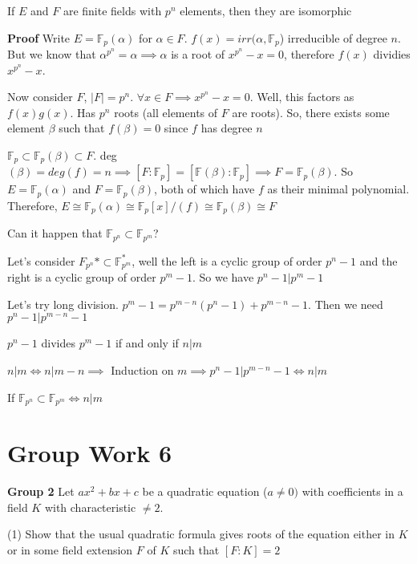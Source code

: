 \documentclass[10pt]{article}
\newcommand{\F}{\mathbb{F}}
\begin{document}
\begin{thm}
    If $E$ and $F$ are finite fields with $p^n$ elements, then they are isomorphic
\end{thm}
\textbf{Proof} Write $E = \F_p(\alpha)$ for $\alpha \in F$. $f(x) = irr(\alpha, \F_p$) irreducible of degree $n$. But we know that $\alpha^{p^n} = \alpha \implies \alpha$ is a root of $x^{p^n} - x =  0$, therefore $f(x)$ dividies $x^{p^n} - x$. 

Now consider $F$, $|F| = p^n$. $\forall x \in F \implies x^{p^n} - x = 0$. Well, this factors as $f(x)g(x)$. Has $p^n$ roots (all elements of $F$ are roots). So, there exists some element $\beta$ such that $f(\beta) = 0$ since $f$ has degree $n$

$\F_p \subset \F_p(\beta) \subset F$. deg$(\beta) = deg(f) = n \implies [F: \F_p] = [\F(\beta) : \F_p] \implies F = \F_p(\beta)$. So $E = \F_p(\alpha)$ and $F = \F_p(\beta)$, both of which have $f$ as their minimal polynomial. Therefore, $E \cong \F_p(\alpha) \cong \F_p[x]/(f) \cong \F_p(\beta) \cong F$

\begin{rmk}
    Can it happen that $\F_{p^n} \subset \F_{p^m}$?
\end{rmk}
Let's consider $F_{p^n}* \subset \F_{p^m}^*$, well the left is a cyclic group of order $p^n - 1$ and the right is a cyclic group of order $p^m - 1$. So we have $p^n - 1|p^m - 1$

Let's try long division. $p^m - 1 = p^{m-n}(p^n - 1) + p^{m-n} - 1$. Then we need $p^n - 1 | p^{m-n} - 1$

\begin{thm}
    $p^n - 1$ divides $p^m - 1$ if and only if $n | m$
\end{thm}
$n | m \iff n | m - n \implies$ Induction on $m \implies p^n - 1 | p^{m-n} - 1 \iff n | m$
\begin{cor}
    If $\F_{p^n} \subset \F_{p^m} \iff n | m$
\end{cor}

\section{Group Work 6}
\textbf{Group 2}
Let $ax^2 + bx + c$ be a quadratic equation ($a \neq 0)$ with coefficients in a field $K$ with characteristic $\neq 2$. 

(1) Show that the usual quadratic formula gives roots of the equation either in $K$ or in some field extension $F$ of $K$ such that $[F : K] = 2$
\end{document}
